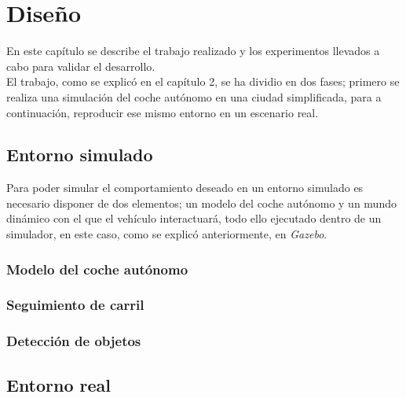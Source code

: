 \chapter{Diseño}
\label{cap:capitulo4}

En este capítulo se describe el trabajo realizado y los experimentos llevados a cabo para validar el desarrollo.\\

El trabajo, como se explicó en el capítulo 2, se ha dividio en dos fases; primero se realiza una simulación del coche autónomo en una ciudad simplificada, para a continuación, reproducir ese mismo entorno en un escenario real.

\section{Entorno simulado}
Para poder simular el comportamiento deseado en un entorno simulado es necesario disponer de dos elementos; un modelo del coche autónomo y un mundo dinámico con el que el vehículo interactuará, todo ello ejecutado dentro de un simulador, en este caso, como se explicó anteriormente, en \textit{Gazebo}.

\subsection{Modelo del coche autónomo}





\subsection{Seguimiento de carril}







\subsection{Detección de objetos}










\section{Entorno real}

















